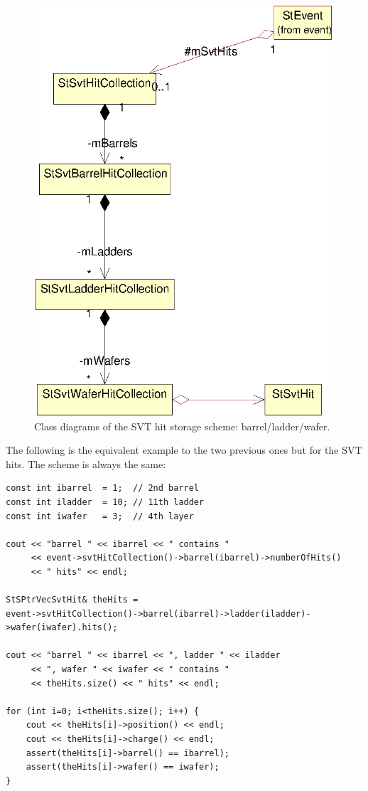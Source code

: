 \documentclass[twoside]{article}
\begin{document}
\begin{figure}[htb]
    \begin{center}
        \includegraphics{svt.eps}
        \caption{Class diagrams of the SVT hit storage scheme: barrel/ladder/wafer.}
        \label{fig:svt}
    \end{center}
\end{figure}

The following is the equivalent example to the two previous ones but for the SVT hits.
The scheme is always the same:
\begin{verbatim}
const int ibarrel  = 1;  // 2nd barrel
const int iladder  = 10; // 11th ladder
const int iwafer   = 3;  // 4th layer

cout << "barrel " << ibarrel << " contains "
     << event->svtHitCollection()->barrel(ibarrel)->numberOfHits()
     << " hits" << endl;

StSPtrVecSvtHit& theHits =
event->svtHitCollection()->barrel(ibarrel)->ladder(iladder)->wafer(iwafer).hits();

cout << "barrel " << ibarrel << ", ladder " << iladder
     << ", wafer " << iwafer << " contains "
     << theHits.size() << " hits" << endl;

for (int i=0; i<theHits.size(); i++) {
    cout << theHits[i]->position() << endl;
    cout << theHits[i]->charge() << endl;
    assert(theHits[i]->barrel() == ibarrel);
    assert(theHits[i]->wafer() == iwafer);
}

\end{verbatim}
\end{document}
